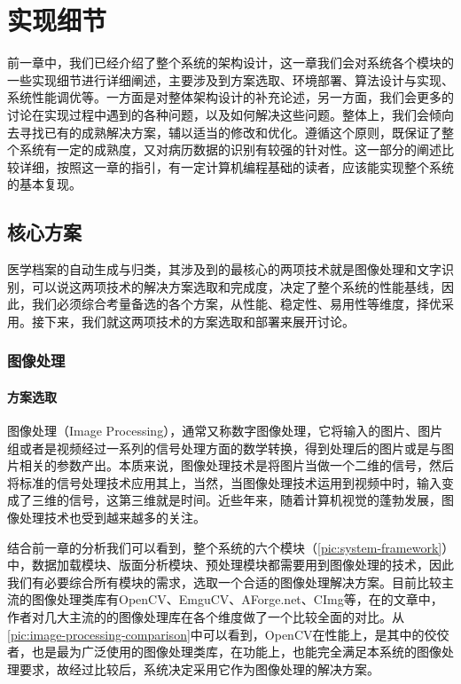 \chapter{实现细节}
\label{chap:implements}
前一章中，我们已经介绍了整个系统的架构设计，这一章我们会对系统各个模块的一些实现细节进行详细阐述，主要涉及到方案选取、环境部署、算法设计与实现、系统性能调优等。一方面是对整体架构设计的补充论述，另一方面，我们会更多的讨论在实现过程中遇到的各种问题，以及如何解决这些问题。整体上，我们会倾向去寻找已有的成熟解决方案，辅以适当的修改和优化。遵循这个原则，既保证了整个系统有一定的成熟度，又对病历数据的识别有较强的针对性。这一部分的阐述比较详细，按照这一章的指引，有一定计算机编程基础的读者，应该能实现整个系统的基本复现。

\section{核心方案}
医学档案的自动生成与归类，其涉及到的最核心的两项技术就是图像处理和文字识别，可以说这两项技术的解决方案选取和完成度，决定了整个系统的性能基线，因此，我们必须综合考量备选的各个方案，从性能、稳定性、易用性等维度，择优采用。接下来，我们就这两项技术的方案选取和部署来展开讨论。

\subsection{图像处理}
\subsubsection{方案选取}
图像处理（Image Processing），通常又称数字图像处理，它将输入的图片、图片组或者是视频经过一系列的信号处理方面的数学转换，得到处理后的图片或是与图片相关的参数产出\citep{gonzalez2008digital}。本质来说，图像处理技术是将图片当做一个二维的信号，然后将标准的信号处理技术应用其上，当然，当图像处理技术运用到视频中时，输入变成了三维的信号，这第三维就是时间。近些年来，随着计算机视觉的蓬勃发展，图像处理技术也受到越来越多的关注。

结合前一章的分析我们可以看到，整个系统的六个模块（\autoref{pic:system-framework}）中，数据加载模块、版面分析模块、预处理模块都需要用到图像处理的技术，因此我们有必要综合所有模块的需求，选取一个合适的图像处理解决方案。目前比较主流的图像处理类库有OpenCV\citep{bradski2008OpenCV}、EmguCV\citep{Shi013emgu}、AForge.net\citep{Kirillov2013Aforge}、CImg\citep{tschumperle2012cimg}等，在\citep{XianrongWang}的文章中，作者对几大主流的的图像处理库在各个维度做了一个比较全面的对比。从\autoref{pic:image-processing-comparison}中可以看到，OpenCV在性能上，是其中的佼佼者，也是最为广泛使用的图像处理类库，在功能上，也能完全满足本系统的图像处理要求，故经过比较后，系统决定采用它作为图像处理的解决方案。

